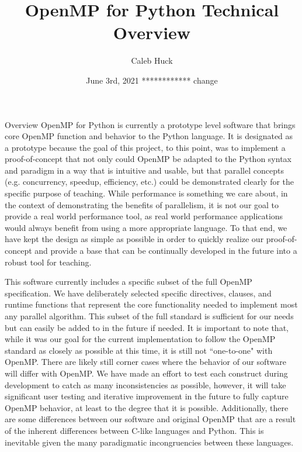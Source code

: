 \documentclass[letterpaper,12pt]{article} %
\makeatletter
\def\section{\@startsection{section}{1}%
  \z@{.7\linespacing\@plus\linespacing}{.5\linespacing}%
  {\normalfont\scshape}}%
\makeatother
\begin{document}
\title{\Large{\textbf{OpenMP for Python Technical Overview}}}
\author{Caleb Huck}
\date{June 3rd, 2021 ************ change}
\maketitle

\section{Overview}
OpenMP for Python is currently a prototype level software that brings core OpenMP function and behavior to the Python language. It is designated as a prototype because the goal of this project, to this point, was to implement a proof-of-concept that not only could OpenMP be adapted to the Python syntax and paradigm in a way that is intuitive and usable, but that parallel concepts (e.g. concurrency, speedup, efficiency, etc.) could be demonstrated clearly for the specific purpose of teaching. While performance is something we care about, in the context of demonstrating the benefits of parallelism, it is not our goal to provide a real world performance tool, as real world performance applications would always benefit from using a more appropriate language. To that end, we have kept the design as simple as possible in order to quickly realize our proof-of-concept and provide a base that can be continually developed in the future into a robust tool for teaching. 

This software currently includes a specific subset of the full OpenMP specification. We have deliberately selected specific directives, clauses, and runtime functions that represent the core functionality needed to implement most any parallel algorithm. This subset of the full standard is sufficient for our needs but can easily be added to in the future if needed. It is important to note that, while it was our goal for the current implementation to follow the OpenMP standard as closely as possible at this time, it is still not ``one-to-one" with OpenMP. There are likely still corner cases where the behavior of our software will differ with OpenMP. We have made an effort to test each construct during development to catch as many inconsistencies as possible, however, it will take significant user testing and iterative improvement in the future to fully capture OpenMP behavior, at least to the degree that it is possible. Additionally, there are some differences between our software and original OpenMP that are a result of the inherent differences between C-like languages and Python. This is inevitable given the many paradigmatic incongruencies between these languages. 
\end{document}
